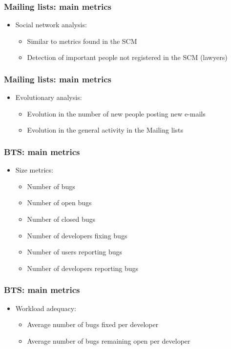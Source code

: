 \documentclass{beamer}
\begin{document}
\begin{frame}
 \frametitle{Mailing lists: main metrics}
 \begin{itemize}
 \item Social network analysis:
  \begin{itemize}
   \item Similar to metrics found in the SCM
   \item Detection of important people not registered in the SCM (lawyers)
  \end{itemize}
 \end{itemize}
\end{frame}


\begin{frame}
 \frametitle{Mailing lists: main metrics}
 \begin{itemize}
 \item Evolutionary analysis:
  \begin{itemize}
   \item Evolution in the number of new people posting new e-mails
   \item Evolution in the general activity in the Mailing lists
  \end{itemize}
 \end{itemize}
\end{frame}



\begin{frame}
 \frametitle{BTS: main metrics}
 \begin{itemize}
 \item Size metrics:
  \begin{itemize}
   \item Number of bugs
   \item Number of open bugs
   \item Number of closed bugs
   \item Number of developers fixing bugs
   \item Number of users reporting bugs
   \item Number of developers reporting bugs
  \end{itemize}
 \end{itemize}
\end{frame}


\begin{frame}
 \frametitle{BTS: main metrics}
 \begin{itemize}
 \item Workload adequacy:
  \begin{itemize}
   \item Average number of bugs fixed per developer
   \item Average number of bugs remaining open per developer
  \end{itemize}
 \end{itemize}
\end{frame}
\end{document}
